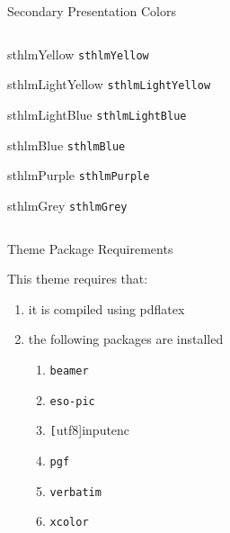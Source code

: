 \documentclass[compress,PxFont]{beamer}
\begin{document}
\begin{frame}{Secondary Presentation Colors}
\begin{columns}
\begin{column}{.48\linewidth}
\begin{beamercolorbox}[wd=\linewidth,ht=2ex,dp=0.7ex]{sthlmYellow}
	\texttt{sthlmYellow}
\end{beamercolorbox}

\begin{beamercolorbox}[wd=\linewidth,ht=2ex,dp=0.7ex]{sthlmLightYellow}
	\texttt{sthlmLightYellow}
\end{beamercolorbox}

\begin{beamercolorbox}[wd=\linewidth,ht=2ex,dp=0.7ex]{sthlmLightBlue}
	\texttt{sthlmLightBlue}
\end{beamercolorbox}

\begin{beamercolorbox}[wd=\linewidth,ht=2ex,dp=0.7ex]{sthlmBlue}
	\texttt{sthlmBlue}
\end{beamercolorbox}

\begin{beamercolorbox}[wd=\linewidth,ht=2ex,dp=0.7ex]{sthlmPurple}
	\texttt{sthlmPurple}
\end{beamercolorbox}

\begin{beamercolorbox}[wd=\linewidth,ht=2ex,dp=0.7ex]{sthlmGrey}
	\texttt{sthlmGrey}
\end{beamercolorbox}

\end{column}
\end{columns}
\end{frame}


\begin{frame}{Theme Package Requirements}

This theme requires that:

\begin{enumerate}
	\item it is compiled using pdflatex 
	\item the following packages are installed
	\begin{enumerate}
		\item \texttt{beamer}
		\item \texttt{eso-pic}
		\item \texttt[utf8]{inputenc}
		\item \texttt{pgf}
		\item \texttt{verbatim}
		\item \texttt{xcolor}
	\end{enumerate}
\end{enumerate}


\end{frame}
\end{document}
